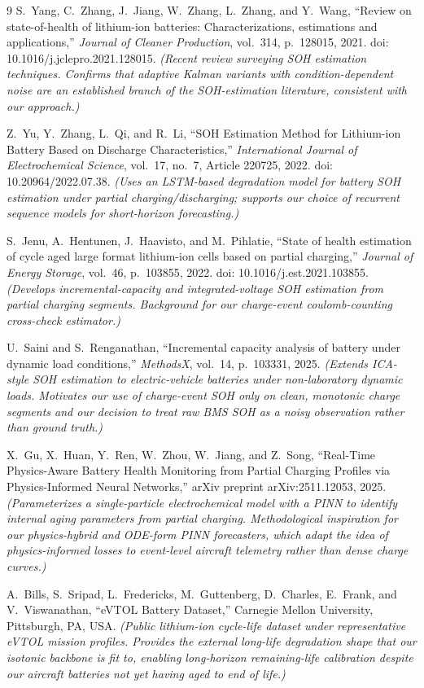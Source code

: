\documentclass[11pt]{article}
\begin{document}
\begin{thebibliography}{9}
S.~Yang, C.~Zhang, J.~Jiang, W.~Zhang, L.~Zhang, and Y.~Wang,
``Review on state-of-health of lithium-ion batteries: Characterizations,
estimations and applications,''
\emph{Journal of Cleaner Production}, vol.~314, p.~128015, 2021.
doi: 10.1016/j.jclepro.2021.128015.
\emph{(Recent review surveying SOH estimation techniques. Confirms that
adaptive Kalman variants with condition-dependent noise are an
established branch of the SOH-estimation literature, consistent with our
approach.)}

Z.~Yu, Y.~Zhang, L.~Qi, and R.~Li,
``SOH Estimation Method for Lithium-ion Battery Based on Discharge
Characteristics,''
\emph{International Journal of Electrochemical Science},
vol.~17, no.~7, Article 220725, 2022.
doi: 10.20964/2022.07.38.
\emph{(Uses an LSTM-based degradation model for battery SOH estimation
under partial charging/discharging; supports our choice of recurrent
sequence models for short-horizon forecasting.)}

S.~Jenu, A.~Hentunen, J.~Haavisto, and M.~Pihlatie,
``State of health estimation of cycle aged large format lithium-ion
cells based on partial charging,''
\emph{Journal of Energy Storage}, vol.~46, p.~103855, 2022.
doi: 10.1016/j.est.2021.103855.
\emph{(Develops incremental-capacity and integrated-voltage SOH
estimation from partial charging segments. Background for our charge-event
coulomb-counting cross-check estimator.)}

U.~Saini and S.~Renganathan,
``Incremental capacity analysis of battery under dynamic load
conditions,''
\emph{MethodsX}, vol.~14, p.~103331, 2025.
\emph{(Extends ICA-style SOH estimation to electric-vehicle batteries
under non-laboratory dynamic loads. Motivates our use of charge-event
SOH only on clean, monotonic charge segments and our decision to treat
raw BMS SOH as a noisy observation rather than ground truth.)}

X.~Gu, X.~Huan, Y.~Ren, W.~Zhou, W.~Jiang, and Z.~Song,
``Real-Time Physics-Aware Battery Health Monitoring from Partial Charging
Profiles via Physics-Informed Neural Networks,''
arXiv preprint arXiv:2511.12053, 2025.
\emph{(Parameterizes a single-particle electrochemical model with a
PINN to identify internal aging parameters from partial charging.
Methodological inspiration for our physics-hybrid and ODE-form PINN
forecasters, which adapt the idea of physics-informed losses to
event-level aircraft telemetry rather than dense charge curves.)}

A.~Bills, S.~Sripad, L.~Fredericks, M.~Guttenberg, D.~Charles, E.~Frank,
and V.~Viswanathan,
``eVTOL Battery Dataset,''
Carnegie Mellon University, Pittsburgh, PA, USA.
\emph{(Public lithium-ion cycle-life dataset under representative eVTOL
mission profiles. Provides the external long-life degradation shape
that our isotonic backbone is fit to, enabling long-horizon remaining-life
calibration despite our aircraft batteries not yet having aged to end of
life.)}

\end{thebibliography}
\end{document}
